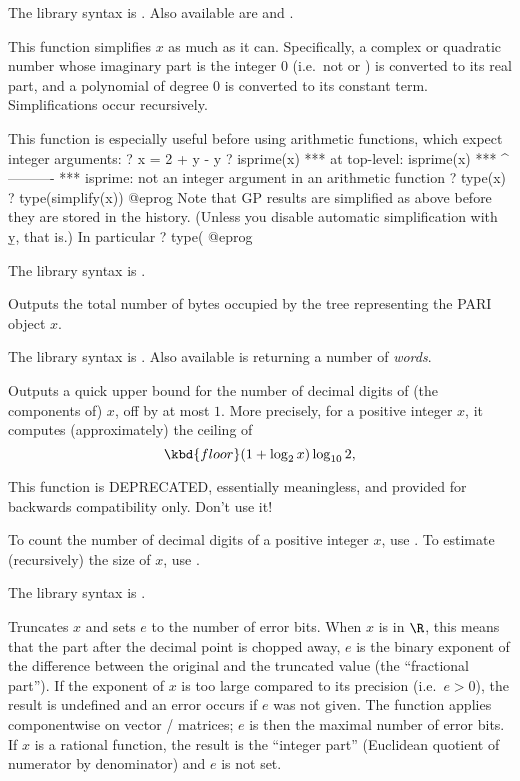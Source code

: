 The library syntax is .
Also available are  and
.

\label{se:simplify}
This function simplifies $x$ as much as it can. Specifically, a complex or
quadratic number whose imaginary part is the integer 0 (i.e.~not 
or ) is converted to its real part, and a polynomial of degree $0$
is converted to its constant term. Simplifications occur recursively.

This function is especially useful before using arithmetic functions,
which expect integer arguments:
\bprog
? x = 2 + y - y
? isprime(x)
  ***   at top-level: isprime(x)
  ***                 ^----------
  *** isprime: not an integer argument in an arithmetic function
? type(x)
? type(simplify(x))
@eprog
Note that GP results are simplified as above before they are stored in the
history. (Unless you disable automatic simplification with \b{y}, that is.)
In particular
\bprog
? type(%
@eprog

The library syntax is .

\label{se:sizebyte}
Outputs the total number of bytes occupied by the tree representing the
PARI object $x$.

The library syntax is .
Also available is  returning a
number of \emph{words}.

\label{se:sizedigit}
Outputs a quick upper bound for the number of decimal digits of (the
components of) $x$, off by at most $1$. More precisely, for a positive
integer $x$, it computes (approximately) the ceiling of
$$\kbd{floor}(1 + \log_2 x) \log_{10}2,$$

This function is DEPRECATED, essentially meaningless, and provided for
backwards compatibility only. Don't use it!

To count the number of decimal digits of a positive integer $x$, use
. To estimate (recursively) the size of $x$, use
.

The library syntax is .

\label{se:truncate}
Truncates $x$ and sets $e$ to the number of
error bits. When $x$ is in $\R$, this means that the part after the decimal
point is chopped away, $e$ is the binary exponent of the difference between
the original and the truncated value (the ``fractional part''). If the
exponent of $x$ is too large compared to its precision (i.e.~$e>0$), the
result is undefined and an error occurs if $e$ was not given. The function
applies componentwise on vector / matrices; $e$ is then the maximal number of
error bits. If $x$ is a rational function, the result is the ``integer part''
(Euclidean quotient of numerator by denominator) and $e$ is not set.

